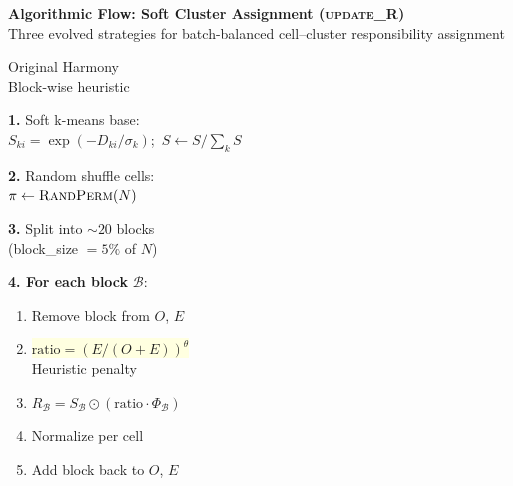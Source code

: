 \documentclass[8pt]{article}
\newlength{\colw}
\begin{document}
\setlength{\colw}{0.32\textwidth}

\begin{center}
{\large\bfseries Algorithmic Flow: Soft Cluster Assignment (\textsc{update\_R})}\\[1pt]
{\scriptsize Three evolved strategies for batch-balanced cell--cluster responsibility assignment}
\end{center}
\vspace{2pt}

\noindent
\begin{minipage}[t]{\colw}
\begin{tcolorbox}[colback=hdrA, colframe=hdrA, fontupper=\bfseries\footnotesize\color{white},
    arc=2pt, left=2pt, right=2pt, top=1pt, bottom=1pt]
\centering Original Harmony\\[-2pt]
{\scriptsize\mdseries Block-wise heuristic}
\end{tcolorbox}
\vspace{1pt}

\begin{stepbox}
\textbf{1.} Soft k-means base:\\
$S_{ki}\!=\!\exp(-D_{ki}/\sigma_k)$;\ $S \!\gets\! S/\!\sum_k\!S$
\end{stepbox}\vspace{1pt}

\begin{stepbox}
\textbf{2.} Random shuffle cells:\\
$\pi \gets \textsc{RandPerm}(N)$
\end{stepbox}\vspace{1pt}

\begin{stepbox}
\textbf{3.} Split into ${\sim}20$ blocks\\
(block\_size $= 5\%$ of $N$)
\end{stepbox}\vspace{1pt}

\begin{warnbox}
\textbf{4. For each block} $\mathcal{B}$:
\begin{enumerate}[leftmargin=1em, itemsep=0pt, topsep=1pt, parsep=0pt]
\item Remove block from $O$, $E$
\item \colorbox{lightyellow}{$\text{ratio}\!=\!(E/(O\!+\!E))^{\theta}$}\\
    {\scriptsize\color{removed} Heuristic penalty}
\item $R_\mathcal{B}\!=\!S_\mathcal{B}\!\odot\!(\text{ratio}\!\cdot\!\Phi_\mathcal{B})$
\item Normalize per cell
\item Add block back to $O$, $E$
\end{enumerate}
\end{warnbox}\vspace{1pt}


\end{minipage}
\end{document}
